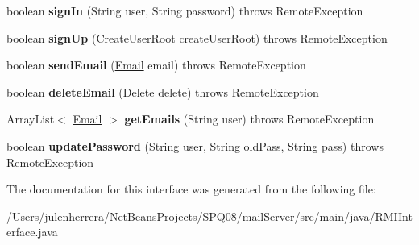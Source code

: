 \begin{DoxyCompactItemize}
\item 
\mbox{\label{interface_r_m_i_interface_a826db0ba8f0814985cfa911ef76a68cc}} 
boolean {\bfseries sign\+In} (String user, String password)  throws Remote\+Exception
\item 
\mbox{\label{interface_r_m_i_interface_a39fbf15bb1115837ce6025aaa47784bb}} 
boolean {\bfseries sign\+Up} (\hyperlink{class_create_user_root}{Create\+User\+Root} create\+User\+Root)  throws Remote\+Exception
\item 
\mbox{\label{interface_r_m_i_interface_ad86e01382cdb0cb8a64710a7e9102524}} 
boolean {\bfseries send\+Email} (\hyperlink{class_email}{Email} email)  throws Remote\+Exception
\item 
\mbox{\label{interface_r_m_i_interface_a86bc2a5cb0bdb04a1aeb9b36e373cd5e}} 
boolean {\bfseries delete\+Email} (\hyperlink{class_delete}{Delete} delete)  throws Remote\+Exception
\item 
\mbox{\label{interface_r_m_i_interface_ad326010c8c132dd3398a4443cf827601}} 
Array\+List$<$ \hyperlink{class_email}{Email} $>$ {\bfseries get\+Emails} (String user)  throws Remote\+Exception
\item 
\mbox{\label{interface_r_m_i_interface_a643b5963469fbc121032c7d75c01c7b9}} 
boolean {\bfseries update\+Password} (String user, String old\+Pass, String pass)  throws Remote\+Exception
\end{DoxyCompactItemize}


The documentation for this interface was generated from the following file\+:\begin{DoxyCompactItemize}
\item 
/\+Users/julenherrera/\+Net\+Beans\+Projects/\+S\+P\+Q08/mail\+Server/src/main/java/R\+M\+I\+Interface.\+java\end{DoxyCompactItemize}
